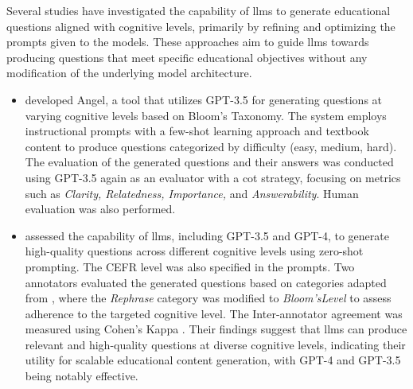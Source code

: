  Several studies have investigated the capability of \ac{llms} to generate educational questions aligned with cognitive levels, primarily by refining and optimizing the prompts given to the models. These approaches aim to guide \ac{llms} towards producing questions that meet specific educational objectives without any modification of the underlying model architecture.
\begin{itemize}
    \item \cite{blobstein_angel_2023} developed Angel, a tool that utilizes GPT-3.5 for generating questions at varying cognitive levels based on Bloom's Taxonomy. The system employs instructional prompts with a few-shot learning approach and textbook content to produce questions categorized by difficulty (easy, medium, hard). The evaluation of the generated questions and their answers was conducted using GPT-3.5 again as an evaluator with a \ac{cot} strategy, focusing on metrics such as \textit{Clarity, Relatedness, Importance,} and \textit{Answerability}. Human evaluation was also performed.
    \item \cite{scaria_how_2024} assessed the capability of \ac{llms}, including GPT-3.5 and GPT-4, to generate high-quality questions across different cognitive levels using zero-shot prompting. The CEFR level was also specified in the prompts. Two annotators evaluated the generated questions based on categories adapted from \cite{horbach_linguistic_2020}, where the \textit{Rephrase} category was modified to \textit{Bloom'sLevel} to assess adherence to the targeted cognitive level. The Inter-annotator agreement was measured using Cohen's Kappa \cite{cohen_coefficient_1960}. Their findings suggest that \ac{llms} can produce relevant and high-quality questions at diverse cognitive levels, indicating their utility for scalable educational content generation, with GPT-4 and GPT-3.5 being notably effective.

\end{itemize}
